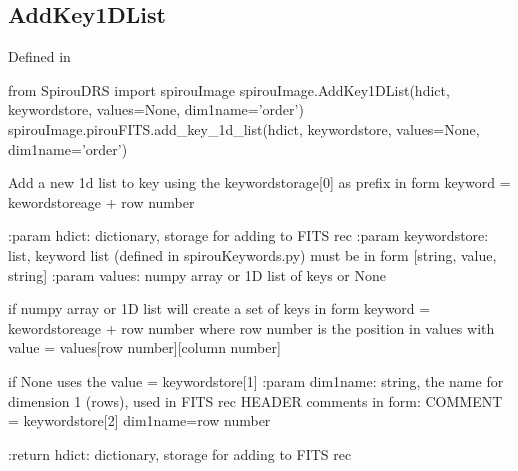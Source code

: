 \noindent\begin{minipage}{\textwidth}
\subsection{AddKey1DList}

Defined in \spirouImage{}

\begin{pythonbox}
from SpirouDRS import spirouImage
spirouImage.AddKey1DList(hdict, keywordstore, values=None, dim1name='order')
spirouImage.pirouFITS.add_key_1d_list(hdict, keywordstore, values=None, dim1name='order')
\end{pythonbox}

\begin{pythondocstring}
Add a new 1d list to key using the keywordstorage[0] as prefix in form
keyword = kewordstoreage + row number

:param hdict: dictionary, storage for adding to FITS rec
:param keywordstore: list, keyword list (defined in spirouKeywords.py)
                     must be in form [string, value, string]
:param values: numpy array or 1D list of keys or None

              if numpy array or 1D list will create a set of keys in form
              keyword = kewordstoreage + row number
              where row number is the position in values
              with value = values[row number][column number]

              if None uses the value = keywordstore[1]
:param dim1name: string, the name for dimension 1 (rows), used in FITS rec
                 HEADER comments in form:
      COMMENT = keywordstore[2] dim1name={row number}

:return hdict: dictionary, storage for adding to FITS rec
\end{pythondocstring}
\end{minipage}

